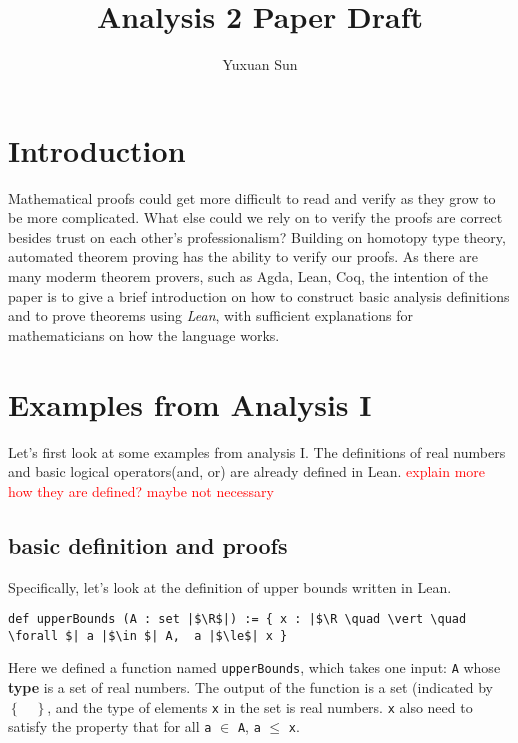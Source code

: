 \documentclass[a4paper]{article}
\title{Analysis 2 Paper Draft}
\author{Yuxuan Sun}
\newcommand{\R}{\mathbb{R}}
\begin{document}
\maketitle

\section{Introduction}
Mathematical proofs could get more difficult to read and verify as they grow to be more complicated. What else could we rely on to verify the proofs are correct besides trust on each other's professionalism? Building on homotopy type theory, automated theorem proving has the ability to verify our proofs. As there are many moderm theorem provers, such as Agda, Lean, Coq, the intention of the paper is to give a brief introduction on how to construct basic analysis definitions and to prove theorems using \textit{Lean}, with sufficient explanations for mathematicians on how the language works.

\section{Examples from Analysis I}

Let's first look at some examples from analysis I. The definitions of real numbers and basic logical operators(and, or) are already defined in Lean. \textcolor{red}{explain more how they are defined? maybe not necessary}

\subsection{basic definition and proofs}

Specifically, let's look at the definition of upper bounds written in Lean.

\begin{listing}[!ht]
\begin{verbatim}
def upperBounds (A : set |$\R$|) := { x : |$\R \quad \vert \quad  \forall $| a |$\in $| A,  a |$\le$| x }
\end{verbatim}
\end{listing}

Here we defined a function named \texttt{upperBounds}, which takes one input: \texttt{A} whose \textbf{type} is a set of real numbers. The output of the function is a set (indicated by $\left\{ \quad \right\} $, and the type of elements \texttt{x} in the set is real numbers.  \texttt{x}  also need to satisfy the property that for all \texttt{a} $\in $ \texttt{A}, \texttt{a} $\le $ \texttt{x}.
\end{document}
